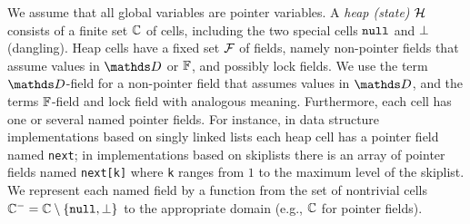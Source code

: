 We assume that all global variables are pointer variables.
A {\it heap (state)} ${\mathcal H}$ consists of a finite set
${\mathbb C}$ of cells, including the two special cells
${\tt null}$ and $\bot$ (dangling).
Heap cells have a fixed set $\mathcal{F}$ of fields, namely
non-pointer fields that assume values in
$\ddomain$ or $\mathbb{F}$, and possibly lock fields.
We use the term $\ddomain$-field for a non-pointer field that
assumes values in $\ddomain$, and the terms $\mathbb{F}$-field and lock field
with analogous meaning.
Furthermore, each cell has one or several named pointer fields.
For instance, in data structure implementations based on singly linked lists
each heap cell has a pointer field named {\tt next}; in implementations
based on skiplists there is an array of pointer fields named
{\tt next[k]} where {\tt k} ranges from $1$ to the maximum level of the
skiplist.
We represent each named field by a function from the set of
nontrivial cells ${\mathbb C}^{-} = {\mathbb C}\setminus\left\{{\tt null},\bot\right\}$ to
the appropriate domain (e.g., ${\mathbb C}$ for pointer fields).

